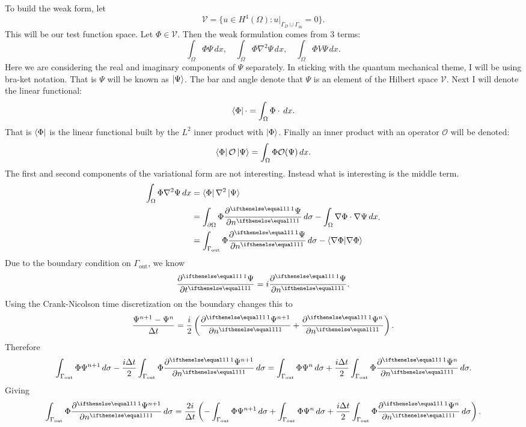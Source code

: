 \documentclass[../../main.tex]{subfiles}
\begin{document}
To build the weak form, let 
\[
		\mathcal V = \{u \in H^4(\Omega) : 
		\left.u\right|_{\Gamma_D \cup \Gamma_\mathrm{in}} = 0\}
.\] 
This will be our test function space.
Let $\Phi \in \mathcal V$.  Then the weak formulation 
comes from 3 terms:
\[
  \int_\Omega \Phi \Psi \, dx, \quad 
  \int_\Omega \Phi \nabla^2 \Psi \, dx, \quad 
  \int_\Omega \Phi V \Psi \, dx
.\] 
Here we are considering the real and imaginary components of $\Psi$ separately.
In sticking with the quantum mechanical theme, 
I will be using bra-ket notation.
That is 
$\Psi$ will be known as $\ket{\Psi}$.  
The bar and angle denote that $\Psi$ is an element of the 
Hilbert space $\mathcal V$. 
Next I will denote the linear functional:
\[
		\bra{\Phi} \cdot = \int_\Omega \Phi \cdot \, dx
.\]
That is $\bra{\Phi}$ is the linear functional 
built by the $L^2$ inner product with $\ket{\Phi}$.  
Finally an inner product with an operator $\mathcal O$ will be denoted:
\[
		\bra{\Phi} \mathcal O \ket{\Psi} = 
		\int_\Omega \Phi \mathcal O(\Psi) \, dx
.\] 
The first and second components of the variational form 
are not interesting.  
Instead what is interesting is the middle term.
\[
  \begin{split}
		  \int_\Omega \Phi \nabla^2 \Psi \, dx 
		  & = \bra{\Phi}\nabla^2 \ket{\Psi} \\
		  & = \int_{\partial \Omega} \Phi \pder{\Psi}{n} \, d\sigma - 
		  \int_\Omega \nabla \Phi \cdot \nabla \Psi \, dx \\
		  & = \int_{\Gamma_\mathrm{out}} \Phi \pder{\Psi}{n} \, d\sigma - 
		  \bra{\nabla \Phi}\ket{\nabla \Phi}
  \end{split}
.\] 
Due to the boundary condition on $\Gamma_\mathrm{out}$, we know
\[
		\pder{\Psi}{t} = i \pder{\Psi}{n}
.\] 
Using the Crank-Nicolson time discretization on the boundary
changes this to
\[
		\frac{\Psi^{n+1} - \Psi^n}{\Delta t} = 
		\frac{i}{2} \left(\pder{\Psi^{n+1}}{n} + \pder{\Psi^n}{n}\right)
.\] 
Therefore
\[
		\int_{\Gamma_\mathrm{out}} \Phi \Psi^{n+1} \, d\sigma - 
		\frac{i \Delta t}{2} 
		\int_{\Gamma_\mathrm{out}} \Phi \pder{\Psi^{n+1}}{n} \, d\sigma = 
		\int_{\Gamma_\mathrm{out}} \Phi \Psi^n \, d\sigma + 
		\frac{i \Delta t}{2} 
		\int_{\Gamma_\mathrm{out}} \Phi \pder{\Psi^n}{n} \, d\sigma
.\] 
Giving
\[
		\int_{\Gamma_\mathrm{out}} \Phi \pder{\Psi^{n+1}}{n} \, d\sigma = 
		\frac{2i}{\Delta t} \left(
				-\int_{\Gamma_\mathrm{out}} \Phi \Psi^{n+1} \, d\sigma + 
				\int_{\Gamma_\mathrm{out}} \Phi \Psi^n \, d\sigma + 
				\frac{i \Delta t}{2} 
				\int_{\Gamma_\mathrm{out}} \Phi \pder{\Psi^n}{n} \, d\sigma
		\right)
.\] 
\end{document}
